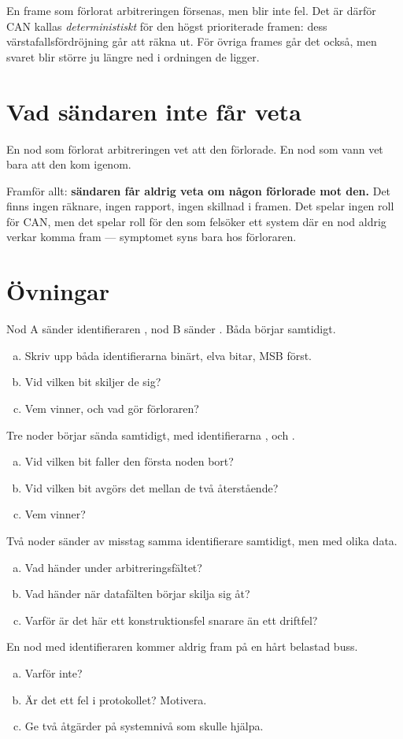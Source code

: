 \begin{aside}
\note En frame som förlorat arbitreringen försenas, men blir inte fel. Det är därför CAN kallas
\emph{deterministiskt} för den högst prioriterade framen: dess värstafallsfördröjning går att
räkna ut. För övriga frames går det också, men svaret blir större ju längre ned i ordningen de
ligger.
\end{aside}

\section{Vad sändaren inte får veta}

En nod som förlorat arbitreringen vet att den förlorade. En nod som vann vet bara att den kom
igenom.

Framför allt: \textbf{sändaren får aldrig veta om någon förlorade mot den.} Det finns ingen
räknare, ingen rapport, ingen skillnad i framen. Det spelar ingen roll för CAN, men det spelar
roll för den som felsöker ett system där en nod aldrig verkar komma fram --- symptomet syns bara
hos förloraren.

\section*{Övningar}

\label{ex:4:1}
Nod A sänder identifieraren , nod B sänder . Båda börjar samtidigt.
\begin{enumerate}[a)]
  \item Skriv upp båda identifierarna binärt, elva bitar, MSB först.
  \item Vid vilken bit skiljer de sig?
  \item Vem vinner, och vad gör förloraren?
\end{enumerate}

\label{ex:4:2}
Tre noder börjar sända samtidigt, med identifierarna ,  och .
\begin{enumerate}[a)]
  \item Vid vilken bit faller den första noden bort?
  \item Vid vilken bit avgörs det mellan de två återstående?
  \item Vem vinner?
\end{enumerate}

\label{ex:4:3}
Två noder sänder av misstag samma identifierare samtidigt, men med olika data.
\begin{enumerate}[a)]
  \item Vad händer under arbitreringsfältet?
  \item Vad händer när datafälten börjar skilja sig åt?
  \item Varför är det här ett konstruktionsfel snarare än ett driftfel?
\end{enumerate}

\label{ex:4:4}
En nod med identifieraren  kommer aldrig fram på en hårt belastad buss.
\begin{enumerate}[a)]
  \item Varför inte?
  \item Är det ett fel i protokollet? Motivera.
  \item Ge två åtgärder på systemnivå som skulle hjälpa.
\end{enumerate}
